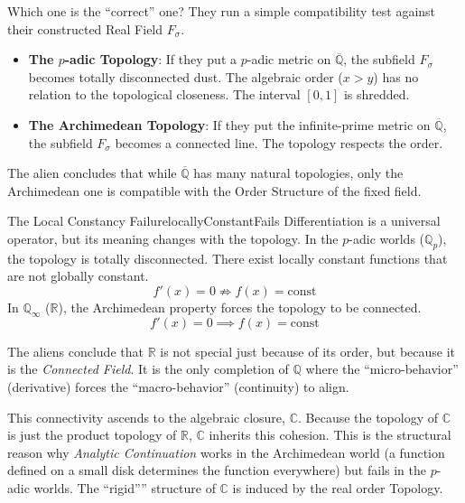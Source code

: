 \documentclass{article}
\newcommand{\C}{{\mathbb{C}}}
\newcommand{\Q}{{\mathbb{Q}}}
\newcommand{\R}{{\mathbb{R}}}
\newcommand{\Rw}{\Rightarrow}
\newcommand{\oln}[1]{{\overline{#1}}}
\begin{document}
Which one is the ``correct'' one? They run a simple compatibility test against their constructed Real Field $F_\sigma$.

\begin{itemize}
    \item \textbf{The $p$-adic Topology}: If they put a $p$-adic metric on $\oln{\Q}$, the subfield $F_\sigma$ becomes totally disconnected dust. The algebraic order ($x > y$) has no relation to the topological closeness. The interval $[0,1]$ is shredded.
    \item \textbf{The Archimedean Topology}: If they put the infinite-prime metric on $\oln{\Q}$, the subfield $F_\sigma$ becomes a connected line. The topology respects the order.
\end{itemize}

The alien concludes that while $\oln{\Q}$ has many natural topologies, only the Archimedean one is compatible with the Order Structure of the fixed field.

\begin{example}{The Local Constancy Failure}{locallyConstantFails}
    Differentiation is a universal operator, but its meaning changes with the topology. In the $p$-adic worlds ($\Q_p$), the topology is totally disconnected. There exist locally constant functions that are not globally constant.
    \[ f'(x) = 0 \not\Rw f(x) = \text{const} \]
    In $\Q_\infty$ ($\R$), the Archimedean property forces the topology to be connected.
    \[ f'(x) = 0 \implies f(x) = \text{const} \]
\end{example}

The aliens conclude that $\R$ is not special just because of its order, but because it is the \emph{Connected Field}. It is the only completion of $\Q$ where the ``micro-behavior'' (derivative) forces the ``macro-behavior'' (continuity) to align.

This connectivity ascends to the algebraic closure, $\C$. Because the topology of $\C$ is just the product
topology of $\R$, $\C$ inherits this cohesion. This is the structural reason why \emph{Analytic Continuation}
works in the Archimedean world (a function defined on a small disk determines the function everywhere) but
fails in the $p$-adic worlds. The ``rigid'''' structure of $\C$ is induced by the real order
Topology.

\printbibliography
\end{document}
